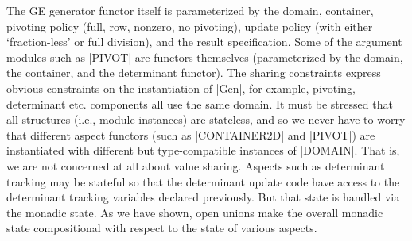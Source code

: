 \documentclass[draft]{elsart}
\begin{document}
The GE generator functor itself is 
parameterized by the domain, container, pivoting policy (full, row,
nonzero, no pivoting), update policy (with either `fraction-less'
or full division), and the result specification. Some of the
argument modules such as |PIVOT| are functors themselves (parameterized
by the domain, the container, and the determinant functor). The sharing
constraints express obvious constraints on the instantiation of |Gen|,
for example, pivoting, determinant etc. components all use the same
domain. It must be stressed that all structures (i.e., module
instances) are stateless, and so we never have to worry that different
aspect functors (such as |CONTAINER2D| and |PIVOT|) are instantiated
with different but type-compatible instances of |DOMAIN|. That is, we
are not concerned at all about value sharing. Aspects such as
determinant tracking may be stateful so that the determinant update
code have access to the determinant tracking variables declared
previously. But that state is handled via the monadic state. As we
have shown, open unions make the overall monadic state compositional
with respect to the state of various aspects.
\end{document}

